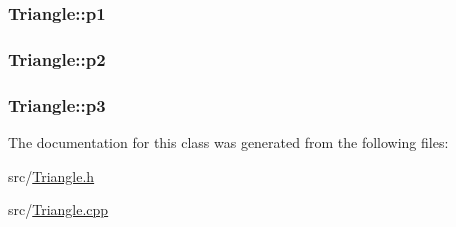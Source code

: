 \subsubsection[{\texorpdfstring{p1}{p1}}]{ Triangle\+::p1\hspace{0.3cm}{\ttfamily [private]}}\hypertarget{classTriangle_a0461ba6ca1a0e1aa84062f93eacbe8b8}{}\label{classTriangle_a0461ba6ca1a0e1aa84062f93eacbe8b8}
\subsubsection[{\texorpdfstring{p2}{p2}}]{ Triangle\+::p2\hspace{0.3cm}{\ttfamily [private]}}\hypertarget{classTriangle_aa15acbc4f123f3e9e75e574566c2679a}{}\label{classTriangle_aa15acbc4f123f3e9e75e574566c2679a}
\subsubsection[{\texorpdfstring{p3}{p3}}]{ Triangle\+::p3\hspace{0.3cm}{\ttfamily [private]}}\hypertarget{classTriangle_a600c7366c1dad8996026742eb12434c6}{}\label{classTriangle_a600c7366c1dad8996026742eb12434c6}


The documentation for this class was generated from the following files\+:\begin{DoxyCompactItemize}
\item 
src/\hyperlink{Triangle_8h}{Triangle.\+h}\item 
src/\hyperlink{Triangle_8cpp}{Triangle.\+cpp}\end{DoxyCompactItemize}

